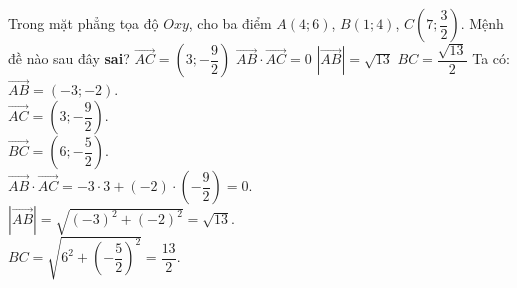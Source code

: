 \begin{ex}%
 Trong mặt phẳng tọa độ $Oxy$, cho ba điểm $A(4;6)$, $B(1;4)$, $C\left(7;\dfrac{3}{2}\right)$. Mệnh đề nào sau đây \textbf{sai}?
 \choice
  {$\vec{AC} = \left(3; -\dfrac{9}{2}\right)$}
  {$\vec{AB} \cdot \vec{AC} = 0$}
  {$\left|\vec{AB}\right| = \sqrt{13}$}
  {\True $BC = \dfrac{\sqrt{13}}{2}$}
 \loigiai
 {
 Ta có:\\
 $\vec{AB} = (-3;-2)$.\\
 $\vec{AC} = \left(3; -\dfrac{9}{2}\right)$.\\
 $\vec{BC} = \left(6; -\dfrac{5}{2}\right)$.\\
 $\vec{AB} \cdot \vec{AC} = -3 \cdot 3 + (-2) \cdot \left(-\dfrac{9}{2}\right) = 0$.\\
 $\left|\vec{AB}\right| = \sqrt{(-3)^2 + (-2)^2} = \sqrt{13}$.\\
 $BC = \sqrt{6^2 + \left(-\dfrac{5}{2}\right)^2} = \dfrac{13}{2}$.
 }
\end{ex}



